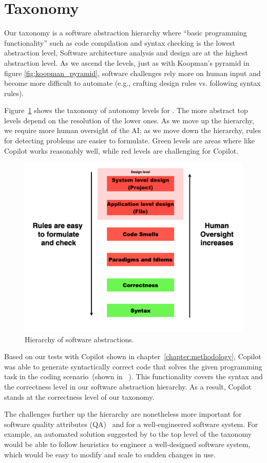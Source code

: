 \section{Taxonomy}
\label{taxonomy}
Our taxonomy is a software abstraction hierarchy where ``basic programming functionality'' such as code compilation and syntax checking is the lowest abstraction level,
Software architecture analysis and design are at the highest abstraction level.
As we ascend the levels, just as with Koopman's pyramid in figure \ref{fig:koopman_pyramid}, 
software challenges rely more on human input and become more difficult to automate (e.g., crafting design rules vs. following syntax rules).

Figure~\ref{fig:taxonomy} shows the taxonomy of autonomy levels for \cct{}. The more abstract top levels depend on the resolution of the lower ones. As we move up the hierarchy, we require more human oversight of the AI; as we move down the hierarchy, rules for detecting problems are easier to formulate. Green levels are areas where \cct{} like Copilot works reasonably well, while red levels are challenging for Copilot.

\begin{figure}[hbt!]
    \centering
    \includegraphics[width=\linewidth]{Figures/taxonomy.png}
    \caption{Hierarchy of software abstractions.}
    \label{fig:taxonomy}
\end{figure}

Based on our tests with Copilot shown in chapter~\ref{chapter:methodology}, Copilot was able to generate syntactically correct code that solves the given programming task in the coding scenario~(shown in ~\repl{}).
This functionality covers the syntax and the correctness level in our software abstraction hierarchy.
As a result, Copilot stands at the correctness level of our taxonomy. 

The challenges further up the hierarchy are nonetheless more important for software quality attributes (QA)~\cite{Ernst2017} and for a well-engineered software system.
For example, an automated solution suggested by \cct{} to the top level of the taxonomy would be able to follow heuristics to engineer a well-designed software system, which would be easy to modify and scale to sudden changes in use.